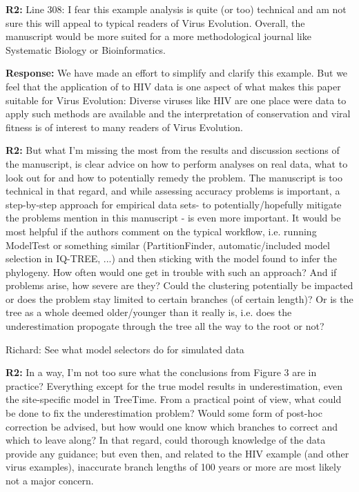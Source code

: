 \documentclass[aps,rmp,onecolumn]{revtex4-1}
\newcommand{\Richard}[1]{{\color{drab}Richard: #1}}
\newcommand{\refb}[1]{\textbf{R2:} #1}
\newcommand{\response}[1]{{\color{black}\textbf{Response:} #1}}
\begin{document}
\refb{Line 308: I fear this example analysis is quite (or too) technical and am not sure this will appeal to typical readers of Virus Evolution. Overall, the manuscript would be more suited for a more methodological journal like Systematic Biology or Bioinformatics.}

\response{We have made an effort to simplify and clarify this example. But we feel that the application of to HIV data is one aspect of what makes this paper suitable for Virus Evolution: Diverse viruses like HIV are one place were data to apply such methods are available and the interpretation of conservation and viral fitness is of interest to many readers of Virus Evolution. }

\refb{But what I’m missing the most from the results and discussion sections of the manuscript, is clear advice on how to perform analyses on real data, what to look out for and how to potentially remedy the problem. The manuscript is too technical in that regard, and while assessing accuracy problems is important, a step-by-step approach for empirical data sets- to potentially/hopefully mitigate the problems mention in this manuscript - is even more important. It would be most helpful if the authors comment on the typical workflow, i.e. running ModelTest or something similar (PartitionFinder, automatic/included model selection in IQ-TREE, ...) and then sticking with the model found to infer the phylogeny. How often would one get in trouble with such an approach? And if problems arise, how severe are they? Could the clustering potentially be impacted or does the problem stay limited to certain branches (of certain length)? Or is the tree as a whole deemed older/younger than it really is, i.e. does the underestimation propogate through the tree all the way to the root or not?}

\Richard{See what model selectors do for simulated data}


\refb{In a way, I’m not too sure what the conclusions from Figure 3 are in practice? Everything except for the true model results in underestimation, even the site-specific model in TreeTime. From a practical point of view, what could be done to fix the underestimation problem? Would some form of post-hoc correction be advised, but how would one know which branches to correct and which to leave along? In that regard, could thorough knowledge of the data provide any guidance; but even then, and related to the HIV example (and other virus examples), inaccurate branch lengths of 100 years or more are most likely not a major concern.}
\end{document}
